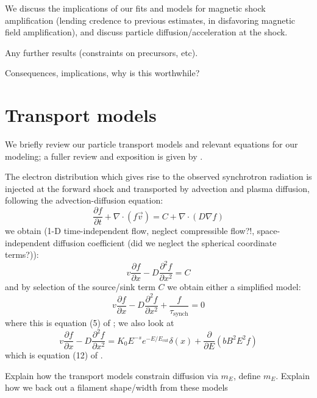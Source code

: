 \documentclass[12pt,preprint]{aastex}  %
\newcommand*{\mt}{\mathrm}
\newcommand*{\ptl}{\partial}
\newcommand*{\del}{\nabla}
\begin{document}
We discuss the implications of our fits and models for magnetic shock
amplification (lending credence to previous estimates, in disfavoring magnetic
field amplification), and discuss particle diffusion/acceleration at the shock.

Any further results (constraints on precursors, etc).

Consequences, implications, why is this worthwhile?

\section{Transport models}

We briefly review our particle transport models and relevant equations for our
modeling; a fuller review and exposition is given by .

The electron distribution which gives rise to the observed synchrotron
radiation is injected at the forward shock and transported by advection
and plasma diffusion, following the advection-diffusion equation:
\[
  \frac{\ptl f}{\ptl t} + \del \cdot \left( f \vec{v} \right)
  = C + \del \cdot \left( D \del f \right)
\]
we obtain (1-D time-independent flow, neglect compressible flow?!,
space-independent diffusion coefficient (did we neglect the spherical
coordinate terms?)):
\[
    v \frac{\ptl f}{\ptl x} - D \frac{\ptl^2 f}{\ptl x^2} = C
\]
and by selection of the source/sink term $C$ we obtain either a
simplified model:
\begin{equation} \label{eq:simp-mod}
    v \frac{\ptl f}{\ptl x} - D \frac{\ptl^2 f}{\ptl x^2} +
    \frac{f}{\tau_{\mt{synch}}} = 0
\end{equation}
where this is equation (5) of ; we also look at
\begin{equation} \label{eq:full-mod}
    v \frac{\ptl f}{\ptl x} - D \frac{\ptl^2 f}{\ptl x^2} =
    K_0 E^{-s} e^{-E/E_{\mt{cut}}} \delta(x) + \frac{\ptl}{\ptl E}
      \left(bB^2E^2f\right)
\end{equation}
which is equation (12) of .

Explain how the transport models constrain diffusion via $m_E$, define $m_E$.
Explain how we back out a filament shape/width from these models
\end{document}
